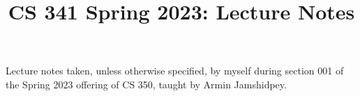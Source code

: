 \documentclass[notes,minted,class=cs341]{agony}
\title{CS 341 Spring 2023: Lecture Notes}
\begin{document}
\renewcommand{\contentsname}{CS 341 Spring 2023:\\{\huge Lecture Notes}}
\thispagestyle{firstpage}
\tableofcontents

Lecture notes taken, unless otherwise specified,
by myself during section 001 of the Spring 2023 offering of CS 350,
taught by Armin Jamshidpey.



\printindex
\end{document}
